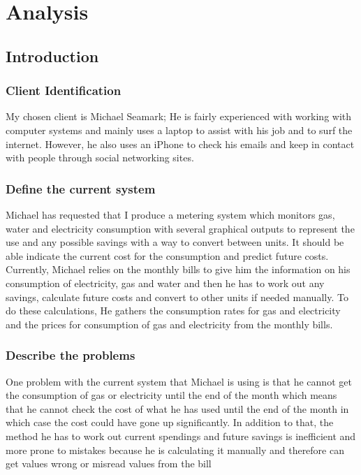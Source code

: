 \chapter{Analysis}

\section{Introduction}
\subsection{Client Identification}
My chosen client is Michael Seamark; He is fairly experienced with working with computer systems and mainly uses a laptop to assist with his job and to surf the internet. However, he also uses an iPhone to check his emails and keep in contact with people through social networking sites.

\subsection{Define the current system}
Michael has requested that I produce a metering system which monitors gas, water and electricity consumption with several graphical outputs to represent the use and any possible savings with a way to convert between units. It should be able indicate the current cost for the consumption and predict future costs. Currently, Michael relies on the monthly bills to give him the information on his consumption of electricity, gas and water and then he has to work out any savings, calculate future costs and convert to other units if needed manually. To do these calculations, He gathers the consumption rates for gas and electricity and the prices for consumption of gas and electricity from the monthly bills.

\subsection{Describe the problems}
One problem with the current system that Michael is using is that he cannot get the consumption of gas or electricity until the end of the month which means that he cannot check the cost of what he has used until the end of the month in which case the cost could have gone up significantly. In addition to that, the method he has to work out current spendings and future savings is inefficient and more prone to mistakes because he is calculating it manually and therefore can get values wrong or misread values from the bill 

